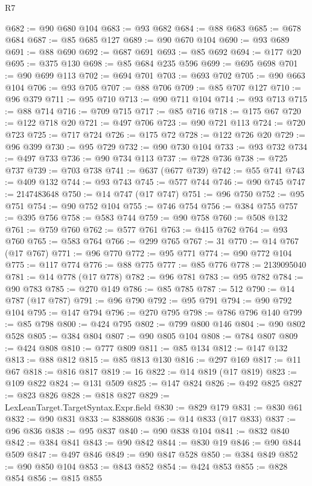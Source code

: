 \begin{lexlean}{R7}
\begin{coremodule}
@682 := @90 @680 @104
@683 := @93 @682
@684 := @88 @683
@685 := @678 @684
@687 := @85 @685 @127
@689 := @90 @670 @104
@690 := @93 @689
@691 := @88 @690
@692 := @687 @691
@693 := @85 @692
@694 := @177 @20
@695 := @375 @130
@698 := @85 @684 @235 @596
@699 := @695 @698
@701 := @90 @699 @113
@702 := @694 @701
@703 := @693 @702
@705 := @90 @663 @104
@706 := @93 @705
@707 := @88 @706
@709 := @85 @707 @127
@710 := @96 @379
@711 := @95 @710
@713 := @90 @711 @104
@714 := @93 @713
@715 := @88 @714
@716 := @709 @715
@717 := @85 @716
@718 := @175 @67
@720 := @122 @718 @20
@721 := @497 @706
@723 := @90 @721 @113
@724 := @720 @723
@725 := @717 @724
@726 := @175 @72
@728 := @122 @726 @20
@729 := @96 @399
@730 := @95 @729
@732 := @90 @730 @104
@733 := @93 @732
@734 := @497 @733
@736 := @90 @734 @113
@737 := @728 @736
@738 := @725 @737
@739 := @703 @738
@741 := @637 (@677 @739)
@742 := @55 @741
@743 := @409 @132
@744 := @93 @743
@745 := @577 @744
@746 := @90 @745
@747 := 2147483648
@750 := @14 @747 (@17 @747)
@751 := @96 @750
@752 := @95 @751
@754 := @90 @752 @104
@755 := @746 @754
@756 := @384 @755
@757 := @395 @756
@758 := @583 @744
@759 := @90 @758
@760 := @508 @132
@761 := @759 @760
@762 := @577 @761
@763 := @415 @762
@764 := @93 @760
@765 := @583 @764
@766 := @299 @765
@767 := 31
@770 := @14 @767 (@17 @767)
@771 := @96 @770
@772 := @95 @771
@774 := @90 @772 @104
@775 := @117 @774
@776 := @88 @775
@777 := @85 @776
@778 := 2139095040
@781 := @14 @778 (@17 @778)
@782 := @96 @781
@783 := @95 @782
@784 := @90 @783
@785 := @270 @149
@786 := @85 @785
@787 := 512
@790 := @14 @787 (@17 @787)
@791 := @96 @790
@792 := @95 @791
@794 := @90 @792 @104
@795 := @147 @794
@796 := @270 @795
@798 := @786 @796 @140
@799 := @85 @798
@800 := @424 @795
@802 := @799 @800 @146
@804 := @90 @802 @528
@805 := @384 @804
@807 := @90 @805 @104
@808 := @784 @807
@809 := @424 @808
@810 := @777 @809
@811 := @85 @134
@812 := @147 @132
@813 := @88 @812
@815 := @85 @813 @130
@816 := @297 @169
@817 := @11 @67
@818 := @816 @817
@819 := 16
@822 := @14 @819 (@17 @819)
@823 := @109 @822
@824 := @131 @509
@825 := @147 @824
@826 := @492 @825
@827 := @823 @826
@828 := @818 @827
@829 := LexLeanTarget.TargetSyntax.Expr.field
@830 := @829 @179
@831 := @830 @61
@832 := @90 @831
@833 := 8388608
@836 := @14 @833 (@17 @833)
@837 := @96 @836
@838 := @95 @837
@840 := @90 @838 @104
@841 := @832 @840
@842 := @384 @841
@843 := @90 @842
@844 := @830 @19
@846 := @90 @844 @509
@847 := @497 @846
@849 := @90 @847 @528
@850 := @384 @849
@852 := @90 @850 @104
@853 := @843 @852
@854 := @424 @853
@855 := @828 @854
@856 := @815 @855

\end{coremodule}
\end{lexlean}
